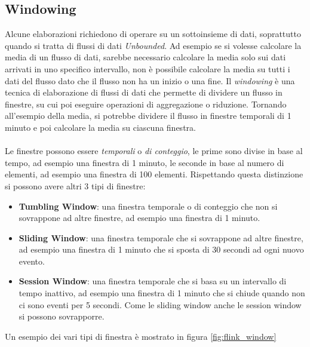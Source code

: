 
\subsection{Windowing}
\label{subsec:flink_windowing}
Alcune elaborazioni richiedono di operare su un sottoinsieme di dati, soprattutto quando si tratta di flussi di dati \textit{Unbounded}.
Ad esempio se si volesse calcolare la media di un flusso di dati, sarebbe necessario calcolare la media solo sui dati arrivati in uno specifico intervallo, 
non è possibile calcolare la media su tutti i dati del flusso dato che il flusso non ha un inizio o una fine.
Il \textit{windowing} è una tecnica di elaborazione di flussi di dati che permette di dividere un flusso in finestre,
su cui poi eseguire operazioni di aggregazione o riduzione.
Tornando all'esempio della media, si potrebbe dividere il flusso in finestre temporali di 1 minuto e poi calcolare la media su ciascuna finestra.\\\\
Le finestre possono essere \textit{temporali} o \textit{di conteggio}, le prime sono divise in base al tempo, ad esempio una finestra di 1 minuto,
le seconde in base al numero di elementi, ad esempio una finestra di 100 elementi.
Rispettando questa distinzione si possono avere altri 3 tipi di finestre:
\begin{itemize}
    \item \textbf{Tumbling Window}: una finestra temporale o di conteggio che non si sovrappone ad altre finestre, ad esempio una finestra di 1 minuto.
    \item \textbf{Sliding Window}: una finestra temporale che si sovrappone ad altre finestre, ad esempio una finestra di 1 minuto che si sposta di 30 secondi ad ogni nuovo evento.
    \item \textbf{Session Window}: una finestra temporale che si basa su un intervallo di tempo inattivo, ad esempio una finestra di 1 minuto che si chiude quando non ci sono eventi per 5 secondi.
    Come le sliding window anche le session window si possono sovrapporre.
\end{itemize}
Un esempio dei vari tipi di finestra è mostrato in figura \ref{fig:flink_window}

